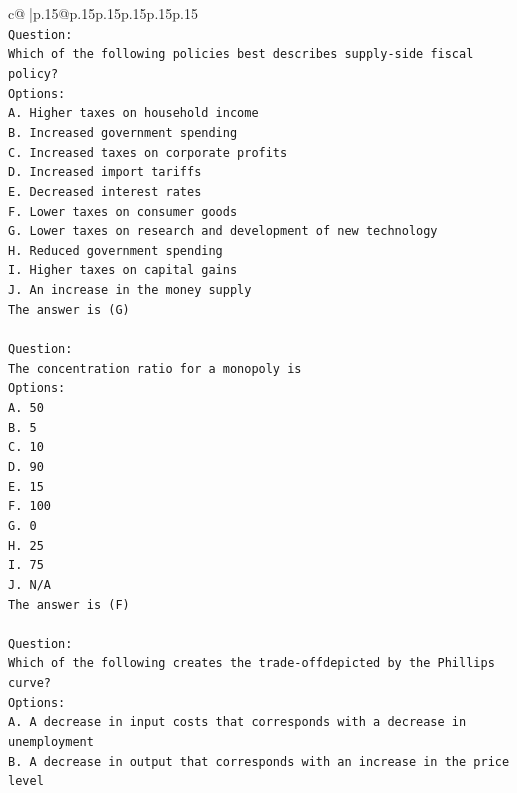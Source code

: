 \documentclass{article}
\begin{document}
{\begin{supertabular}{c@{$\;$}|p{.15\linewidth}@{}p{.15\linewidth}p{.15\linewidth}p{.15\linewidth}p{.15\linewidth}p{.15\linewidth}}
{{{\\ 
\texttt{Question:} \\
\texttt{Which of the following policies best describes supply{-}side fiscal policy?} \\
\texttt{Options:} \\
\texttt{A. Higher taxes on household income} \\
\texttt{B. Increased government spending} \\
\texttt{C. Increased taxes on corporate profits} \\
\texttt{D. Increased import tariffs} \\
\texttt{E. Decreased interest rates} \\
\texttt{F. Lower taxes on consumer goods} \\
\texttt{G. Lower taxes on research and development of new technology} \\
\texttt{H. Reduced government spending} \\
\texttt{I. Higher taxes on capital gains} \\
\texttt{J. An increase in the money supply} \\
\texttt{The answer is (G)} \\
\\ 
\texttt{Question:} \\
\texttt{The concentration ratio for a monopoly is} \\
\texttt{Options:} \\
\texttt{A. 50} \\
\texttt{B. 5} \\
\texttt{C. 10} \\
\texttt{D. 90} \\
\texttt{E. 15} \\
\texttt{F. 100} \\
\texttt{G. 0} \\
\texttt{H. 25} \\
\texttt{I. 75} \\
\texttt{J. N/A} \\
\texttt{The answer is (F)} \\
\\ 
\texttt{Question:} \\
\texttt{Which of the following creates the trade{-}offdepicted by the Phillips curve?} \\
\texttt{Options:} \\
\texttt{A. A decrease in input costs that corresponds with a decrease in unemployment} \\
\texttt{B. A decrease in output that corresponds with an increase in the price level} \\
}}}
\end{supertabular}}
\end{document}
